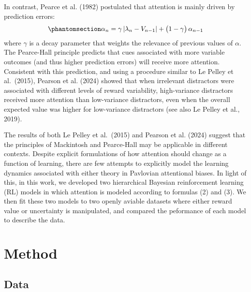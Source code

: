 \documentclass[11pt]{article}
\begin{document}
In contrast, Pearce et al. (1982) postulated that attention is mainly
driven by prediction errors:
\begin{equation}\phantomsection\label{eq-3}{
\alpha_{n} = \gamma\,\lvert \lambda_{n} - V_{n-1}\rvert 
+ \bigl(1 - \gamma\bigr)\,\alpha_{n-1}
}\end{equation} where \(\gamma\) is a decay parameter that weights the
relevance of previous values of \(\alpha\). The Pearce-Hall principle
predicts that cues associated with more variable outcomes (and thus
higher prediction errors) will receive more attention. Consistent with
this prediction, and using a procedure similar to Le Pelley et
al.~(2015), Pearson et al. (2024) showed that when irrelevant
distractors were associated with different levels of reward variability,
high-variance distractors received more attention than low-variance
distractors, even when the overall expected value was higher for
low-variance distractors (see also Le Pelley et al., 2019).

The results of both Le Pelley et al.~(2015) and Pearson et al. (2024)
suggest that the principles of Mackintosh and Pearce-Hall may be
applicable in different contexts. Despite explicit formulations of how
attention should change as a function of learning, there are few
attempts to explicitly model the learning dynamics associated with
either theory in Pavlovian attentional biases. In light of this, in this
work, we developed two hierarchical Bayesian reinforcement learning (RL)
models in which attention is modeled according to formulas (2) and (3).
We then fit these two models to two openly aviable datasets where either
reward value or uncertainty is manipulated, and compared the peformance
of each model to describe the data.

\section{Method}\label{method}

\subsection{Data}\label{data}
\end{document}
